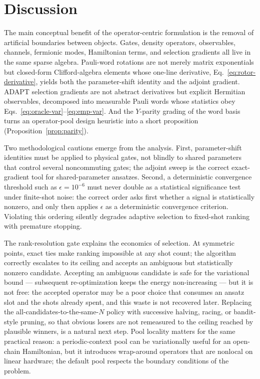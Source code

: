 \documentclass[11pt]{article}
\begin{document}
\section{Discussion}

The main conceptual benefit of the operator-centric formulation is the removal of artificial boundaries between objects.  Gates, density operators, observables, channels, fermionic modes, Hamiltonian terms, and selection gradients all live in the same sparse algebra.  Pauli-word rotations are not merely matrix exponentials but closed-form Clifford-algebra elements whose one-line derivative, Eq.~\eqref{eq:rotor-derivative}, yields both the parameter-shift identity and the adjoint gradient.  ADAPT selection gradients are not abstract derivatives but explicit Hermitian observables, decomposed into measurable Pauli words whose statistics obey Eqs.~\eqref{eq:oracle-var}--\eqref{eq:emp-var}.  And the $Y$-parity grading of the word basis turns an operator-pool design heuristic into a short proposition (Proposition~\ref{prop:parity}).

Two methodological cautions emerge from the analysis.  First, parameter-shift identities must be applied to physical gates, not blindly to shared parameters that control several noncommuting gates; the adjoint sweep is the correct exact-gradient tool for shared-parameter ansatzes.  Second, a deterministic convergence threshold such as $\epsilon=10^{-6}$ must never double as a statistical significance test under finite-shot noise: the correct order asks first whether a signal is statistically nonzero, and only then applies $\epsilon$ as a deterministic convergence criterion.  Violating this ordering silently degrades adaptive selection to fixed-shot ranking with premature stopping.

The rank-resolution gate explains the economics of selection.  At symmetric points, exact ties make ranking impossible at any shot count; the algorithm correctly escalates to its ceiling and accepts an ambiguous but statistically nonzero candidate.  Accepting an ambiguous candidate is safe for the variational bound --- subsequent re-optimization keeps the energy non-increasing --- but it is not free: the accepted operator may be a poor choice that consumes an ansatz slot and the shots already spent, and this waste is not recovered later.  Replacing the all-candidates-to-the-same-$N$ policy with successive halving, racing, or bandit-style pruning, so that obvious losers are not remeasured to the ceiling reached by plausible winners, is a natural next step.  Pool locality matters for the same practical reason: a periodic-context pool can be variationally useful for an open-chain Hamiltonian, but it introduces wrap-around operators that are nonlocal on linear hardware; the default pool respects the boundary conditions of the problem.
\end{document}
